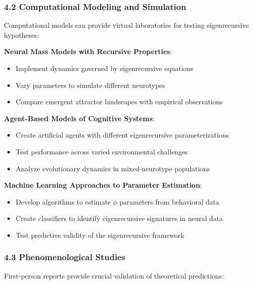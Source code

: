 \documentclass[
]{article}
\providecommand{\tightlist}{%
  \setlength{\itemsep}{0pt}\setlength{\parskip}{0pt}}
\begin{document}
\subsubsection{4.2 Computational Modeling and
Simulation}\label{computational-modeling-and-simulation}

Computational models can provide virtual laboratories for testing
eigenrecursive hypotheses:

\textbf{Neural Mass Models with Recursive Properties}:

\begin{itemize}
\tightlist
\item
  Implement dynamics governed by eigenrecursive equations
\item
  Vary parameters to simulate different neurotypes
\item
  Compare emergent attractor landscapes with empirical observations
\end{itemize}

\textbf{Agent-Based Models of Cognitive Systems}:

\begin{itemize}
\tightlist
\item
  Create artificial agents with different eigenrecursive
  parameterizations
\item
  Test performance across varied environmental challenges
\item
  Analyze evolutionary dynamics in mixed-neurotype populations
\end{itemize}

\textbf{Machine Learning Approaches to Parameter Estimation}:

\begin{itemize}
\tightlist
\item
  Develop algorithms to estimate \(\phi\) parameters from behavioral
  data
\item
  Create classifiers to identify eigenrecursive signatures in neural
  data
\item
  Test predictive validity of the eigenrecursive framework
\end{itemize}

\subsubsection{4.3 Phenomenological
Studies}\label{phenomenological-studies}

First-person reports provide crucial validation of theoretical
predictions:
\end{document}
